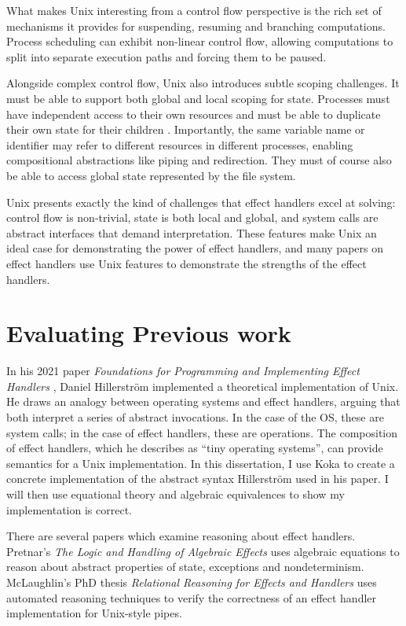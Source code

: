\documentclass[logo,bsc,singlespacing,parskip]{infthesis}
\begin{document}
What makes Unix interesting from a control flow perspective is the rich set of mechanisms it provides for suspending, resuming and branching computations\cite{stevens2013advanced}. Process scheduling can exhibit non-linear control flow, allowing computations to split into separate execution paths and forcing them to be paused.

Alongside complex control flow, Unix also introduces subtle scoping challenges. It must be able to support both global and local scoping for state. Processes must have independent access to their own resources and must be able to duplicate their own state for their children \cite{aiken2006deconstructing}. Importantly, the same variable name or identifier may refer to different resources in different processes, enabling compositional abstractions like piping and redirection. They must of course also be able to access global state represented by the file system.

Unix presents exactly the kind of challenges that effect handlers excel at solving: control flow is non-trivial, state is both local and global, and system calls are abstract interfaces that demand interpretation. These features make Unix an ideal case for demonstrating the power of effect handlers, and many papers on effect handlers use Unix features to demonstrate the strengths of the effect handlers.



\section{Evaluating Previous work}
In his 2021 paper \textit{Foundations for Programming and Implementing Effect Handlers} \cite{hillerstrom_foundations_nodate}, Daniel Hillerström implemented a theoretical implementation of Unix. He draws an analogy between operating systems and effect handlers, arguing that both interpret a series of abstract invocations. In the case of the OS, these are system calls; in the case of effect handlers, these are operations. The composition of effect handlers, which he describes as “tiny operating systems”, can provide semantics for a Unix implementation. In this dissertation, I use Koka to create a concrete implementation of the abstract syntax Hillerström used in his paper. I will then use equational theory and algebraic equivalences to show my implementation is correct.

There are several papers which examine reasoning about effect handlers. Pretnar's \textit{The Logic and Handling of Algebraic Effects} \cite{Pretnar:2010} uses algebraic equations to reason about abstract properties of state, exceptions and nondeterminism. McLaughlin's PhD thesis \textit{Relational Reasoning for Effects and Handlers} \cite{McLaughlin2020} uses automated reasoning techniques to verify the correctness of an effect handler implementation for Unix-style pipes. 
\end{document}
